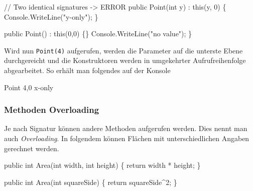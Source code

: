 \documentclass[
  9pt,
  a4paperpaper,
  DIV=11]{scrartcl}
\newenvironment{Shaded}{}{}
\newcommand{\CommentTok}[1]{\textcolor[rgb]{0.42,0.45,0.49}{#1}}
\newcommand{\DataTypeTok}[1]{\textcolor[rgb]{0.84,0.23,0.29}{#1}}
\newcommand{\DecValTok}[1]{\textcolor[rgb]{0.00,0.36,0.77}{#1}}
\newcommand{\FunctionTok}[1]{\textcolor[rgb]{0.44,0.26,0.76}{#1}}
\newcommand{\KeywordTok}[1]{\textcolor[rgb]{0.84,0.23,0.29}{#1}}
\newcommand{\NormalTok}[1]{\textcolor[rgb]{0.14,0.16,0.18}{#1}}
\newcommand{\OperatorTok}[1]{\textcolor[rgb]{0.14,0.16,0.18}{#1}}
\newcommand{\StringTok}[1]{\textcolor[rgb]{0.01,0.18,0.38}{#1}}
\numberwithin{equation}{section}
\begin{document}
\begin{multicols}{2}
\begin{tcolorbox}
\begin{tcolorbox}
\begin{tcolorbox}
\begin{tcolorbox}
\begin{tcolorbox}
\begin{tcolorbox}
\begin{Shaded}
\begin{Highlighting}[]
  \CommentTok{// Two identical signatures {-}\textgreater{} ERROR}
  \KeywordTok{public} \FunctionTok{Point}\OperatorTok{(}\DataTypeTok{int}\NormalTok{ y}\OperatorTok{)} \OperatorTok{:} \KeywordTok{this}\OperatorTok{(}\NormalTok{y}\OperatorTok{,} \DecValTok{0}\OperatorTok{)} \OperatorTok{\{}
\NormalTok{    Console}\OperatorTok{.}\FunctionTok{WriteLine}\OperatorTok{(}\StringTok{"y{-}only"}\OperatorTok{);}
  \OperatorTok{\}}

  \KeywordTok{public} \FunctionTok{Point}\OperatorTok{()} \OperatorTok{:} \KeywordTok{this}\OperatorTok{(}\DecValTok{0}\OperatorTok{,}\DecValTok{0}\OperatorTok{)} \OperatorTok{\{\}}
\NormalTok{  Console}\OperatorTok{.}\FunctionTok{WriteLine}\OperatorTok{(}\StringTok{"no value"}\OperatorTok{);}
\OperatorTok{\}}
\end{Highlighting}
\end{Shaded}

Wird nun \texttt{Point(4)} aufgerufen, werden die Parameter auf die
unterste Ebene durchgereicht und die Konstruktoren werden in umgekehrter
Aufrufreihenfolge abgearbeitet. So erhält man folgendes auf der Konsole

\begin{Shaded}
\begin{Highlighting}[]
\NormalTok{Point 4,0}
\NormalTok{x{-}only}
\end{Highlighting}
\end{Shaded}

\hypertarget{methoden-overloading}{%
\subsubsection{Methoden Overloading}\label{methoden-overloading}}

Je nach Signatur können andere Methoden aufgerufen werden. Dies nennt
man auch \emph{Overloading}. In folgendem können Flächen mit
unterschiedlichen Angaben gerechnet werden.

\begin{Shaded}
\begin{Highlighting}[]
\KeywordTok{public} \DataTypeTok{int} \FunctionTok{Area}\OperatorTok{(}\DataTypeTok{int}\NormalTok{ width}\OperatorTok{,} \DataTypeTok{int}\NormalTok{ height}\OperatorTok{)} \OperatorTok{\{}
  \KeywordTok{return}\NormalTok{ width }\OperatorTok{*}\NormalTok{ height}\OperatorTok{;}
\OperatorTok{\}}

\KeywordTok{public} \DataTypeTok{int} \FunctionTok{Area}\OperatorTok{(}\DataTypeTok{int}\NormalTok{ squareSide}\OperatorTok{)} \OperatorTok{\{}
  \KeywordTok{return}\NormalTok{ squareSide}\OperatorTok{\^{}}\DecValTok{2}\OperatorTok{;}
\OperatorTok{\}}


\end{Highlighting}
\end{Shaded}
\end{tcolorbox}
\end{tcolorbox}
\end{tcolorbox}
\end{tcolorbox}
\end{tcolorbox}
\end{tcolorbox}
\end{multicols}
\end{document}
